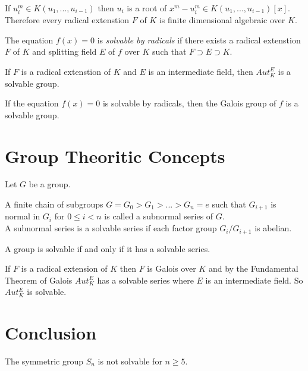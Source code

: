 \begin{remark}
If \(u_i^m \in K(u_1,...,u_{i-1})\) then \(u_i\) is a root of \(x^m-u_i^m \in K(u_1,...,u_{i-1})[x]\). \\
Therefore every radical extenstion \(F\) of \(K\) is finite dimensional algebraic over \(K\).
\end{remark}

\begin{definition}
The equation \(f(x)=0\) is \textit{solvable by radicals} if there exists a radical extenstion \(F\) of \(K\) and splitting field \(E\) of \(f\) over \(K\) such that \(F \supset E \supset K\).
\end{definition}

\begin{theorem}
If \(F\) is a radical extenstion of \(K\) and \(E\) is an intermediate field, then \(Aut_K^E\) is a solvable group.
\end{theorem}

\begin{corollary}
If the equation \(f(x)=0\) is solvable by radicals, then the Galois group of \(f\) is a solvable group.
\end{corollary}

\section{Group Theoritic Concepts}
Let \(G\) be a group.

\begin{definition}
A finite chain of subgroups \(G=G_0>G_1>...>G_n={e}\) such that \(G_{i+1}\) is normal in \(G_i\) for \(0 \leq i < n\) is called a subnormal series of \(G\).\\
A subnormal series is a solvable series if each factor group \(G_i/G_{i+1}\) is abelian.
\end{definition}

\begin{definition}
A group is solvable if and only if it has a solvable series.
\end{definition}

If \(F\) is a radical extension of \(K\) then \(F\) is Galois over \(K\) and by the Fundamental Theorem of Galois \(Aut_K^E\) has a solvable series where \(E\) is an intermediate field. So \(Aut_K^E\) is solvable.

\section{Conclusion}
\begin{theorem}
The symmetric group \(S_n\) is not solvable for \(n \geq 5\).
\end{theorem}

